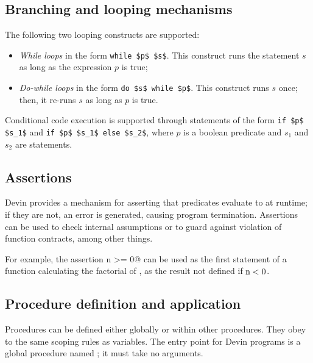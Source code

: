 \documentclass[UdineBachThesis,american,11pt]{PhdThesis}
\begin{document}
  \newpage

  \subsection{Branching and looping mechanisms}

  The following two looping constructs are supported:

  \begin{itemize}
    \item \emph{While loops} in the form \lstinline[mathescape]@while $p$ $s$@.
    This construct runs the statement $s$ as long as the expression $p$ is true;

    \item \emph{Do-while loops} in the form
    \lstinline[mathescape]@do $s$ while $p$@. This construct runs $s$ once;
    then, it re-runs $s$ as long as $p$ is true.
  \end{itemize}

  Conditional code execution is supported through statements of the form
  \lstinline[mathescape]@if $p$ $s_1$@ and
  \lstinline[mathescape]@if $p$ $s_1$ else $s_2$@, where $p$ is a boolean
  predicate and $s_1$ and $s_2$ are statements.

  \subsection{Assertions}

  Devin provides a mechanism for asserting that predicates evaluate to
  \lstinline@true@ at runtime; if they are not, an error is generated, causing
  program termination. Assertions can be used to check internal assumptions or
  to guard against violation of function contracts, among other things.

  For example, the assertion \lstinline@assert n >= 0@ can be used as the first
  statement of a function calculating the factorial of \lstinline@n@, as the
  result not defined if $\text{\lstinline@n@} < 0$.

  \subsection{Procedure definition and application}

  Procedures can be defined either globally or within other procedures. They
  obey to the same scoping rules as variables. The entry point for Devin
  programs is a global procedure named \lstinline@main@; it must take no
  arguments.
\end{document}

